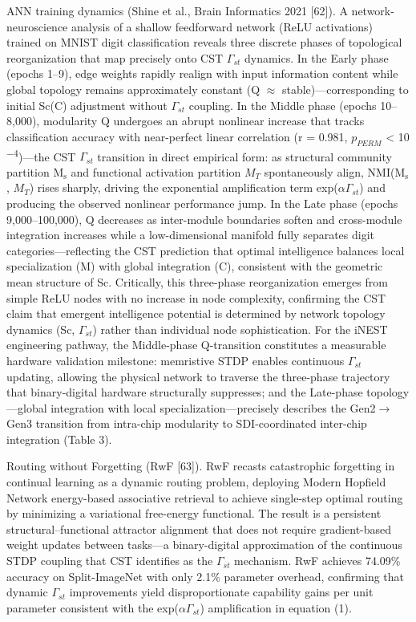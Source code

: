 \documentclass[a4paper,12pt]{article}
\providecommand{\textsubscript}[1]{\ensuremath{_{\text{#1}}}}
\begin{document}
ANN training dynamics (Shine et al., Brain Informatics 2021 [62]).
A network-neuroscience analysis of a shallow feedforward network (ReLU activations) trained on MNIST digit classification reveals three discrete phases of topological reorganization that map precisely onto CST $\Gamma_{st}$ dynamics.
In the Early phase (epochs 1--9), edge weights rapidly realign with input information content while global topology remains approximately constant (Q $\approx$ stable)---corresponding to initial Sc(C) adjustment without $\Gamma_{st}$ coupling.
In the Middle phase (epochs 10--8,000), modularity Q undergoes an abrupt nonlinear increase that tracks classification accuracy with near-perfect linear correlation (r = 0.981, $p_{PERM}$ < 10\textsuperscript{$-$}\textsuperscript{4})---the CST $\Gamma_{st}$ transition in direct empirical form: as structural community partition M\textsubscript{s} and functional activation partition $M_{T}$ spontaneously align, NMI(M\textsubscript{s}, $M_{T}$) rises sharply, driving
the exponential amplification term exp($\alpha$\cdot$\Gamma_{st}$) and producing the observed nonlinear performance jump.
In the Late phase (epochs 9,000--100,000), Q decreases as inter-module boundaries soften and cross-module integration increases while a low-dimensional manifold fully separates digit categories---reflecting the CST prediction that optimal intelligence balances local specialization (M) with global integration (C), consistent with the geometric mean structure of Sc.
Critically, this three-phase reorganization emerges from simple ReLU nodes with no increase in node complexity, confirming the CST claim that emergent intelligence potential is determined by network topology dynamics (Sc, $\Gamma_{st}$) rather than individual node sophistication.
For the iNEST engineering pathway, the Middle-phase Q-transition constitutes a measurable hardware validation milestone: memristive STDP enables continuous $\Gamma_{st}$ updating, allowing the physical network to traverse the three-phase trajectory that binary-digital hardware structurally suppresses; and the Late-phase topology---global integration with local specialization---precisely describes
the Gen2$\rightarrow$Gen3 transition from intra-chip modularity to SDI-coordinated inter-chip integration (Table 3).


Routing without Forgetting (RwF [63]).
RwF recasts catastrophic forgetting in continual learning as a dynamic routing problem, deploying Modern Hopfield Network energy-based associative retrieval to achieve single-step optimal routing by minimizing a variational free-energy functional.
The result is a persistent structural--functional attractor alignment that does not require gradient-based weight updates between tasks---a binary-digital approximation of the continuous STDP coupling that CST identifies as the $\Gamma_{st}$ mechanism.
RwF achieves 74.09\% accuracy on Split-ImageNet with only 2.1\% parameter overhead, confirming that dynamic $\Gamma_{st}$ improvements yield disproportionate capability gains per unit parameter consistent with the exp($\alpha$\cdot$\Gamma_{st}$) amplification in equation (1).
\end{document}
